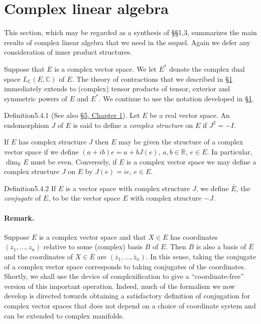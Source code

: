 \section{Complex linear algebra}\label{sec:5:4}
This section, which may be regarded as a synthesis of \S\S1,3, summarizes the main results of complex linear algebra that we need in the sequel. Again we defer any consideration of inner product structures.

Suppose that $E$ is a complex vector space. We let $E^*$ denote the complex dual space $L_{\mathbb C}(E,\mathbb C)$ of $E$. The theory of contractions that we described in \hyperref[sec:5:1]{\S1} immediately extends to (complex) tensor products of tensor, exterior and symmetric powers of $E$ and $E^*$. We continue to use the notation developed in \hyperref[sec:5:1]{\S1}.
\begin{originaltheorem}{Definition}{5.4.1}
(See also \hyperref[sec:1:5]{\S5, Chapter 1}). Let $E$ be a real vector space. An endomorphism $J$ of $E$ is said to define a \emph{complex structure} on $E$ if $J^2=-I$.
\end{originaltheorem}
If $E$ has complex structure $J$ then $E$ may be given the structure of a complex vector space if we define $(a+ib)e=a+bJ(e)$, $a,b\in\mathbb R$, $e\in E$. In particular, $\dim_{\mathbb R}E$ must be even. Conversely, if $E$ is a complex vector space we may define a complex structure $J$ on $E$ by $J(e)=ie$, $e\in E$.
\begin{originaltheorem}{Definition}{5.4.2}
If $E$ is a vector space with complex structure $J$, we define $\bar E$, the \emph{conjugate} of $E$, to be the vector space $E$ with complex structure $-J$.
\end{originaltheorem}
\paragraph{Remark.} Suppose $E$ is a complex vector space and that $X\in E$ has coordinates $(z_1,\ldots,z_n)$ relative to some (complex) basis $B$ of $E$. Then $B$ is also a basis of $\bar E$ and the coordinates of $X\in\bar E$ are $(\bar z_1,\ldots,\bar z_n)$. In this sense, taking the conjugate of a complex vector space corresponds to taking conjugates of the coordinates. Shortly, we shall use the device of complexification to give a ``coordinate-free'' version of this important operation. Indeed, much of the formalism we now develop
is directed towards obtaining a satisfactory definition of conjugation for complex vector spaces that does not depend on a choice of coordinate system and can be extended to complex manifolds.
